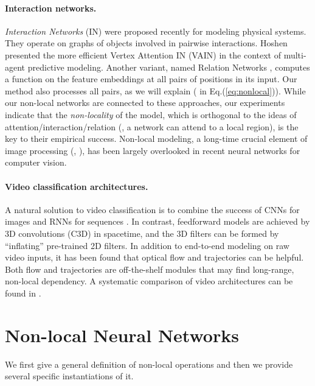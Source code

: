 \documentclass[10pt,twocolumn,letterpaper]{article}
\begin{document}
\paragraph{Interaction networks.} \emph{Interaction Networks} (IN) \cite{Battaglia2016,Watters2017} were proposed recently for modeling physical systems. They operate on graphs of objects involved in pairwise interactions. Hoshen \cite{Hoshen2017} presented the more efficient Vertex Attention IN (VAIN) in the context of multi-agent predictive modeling. Another variant, named Relation Networks \cite{Santoro2017}, computes a function on the feature embeddings at all pairs of positions in its input. Our method also processes all pairs, as we will explain ( in Eq.(\ref{eq:nonlocal})). While our non-local networks are connected to these approaches, our experiments indicate that the \emph{non-locality} of the model, which is orthogonal to the ideas of attention/interaction/relation (\eg, a network can attend to a local region), is the key to their empirical success. Non-local modeling, a long-time crucial element of image processing (\eg, \cite{Efros1999,Buades2005}), has been largely overlooked in recent neural networks for computer vision.

\paragraph{Video classification architectures.} A natural solution to video classification is to combine the success of CNNs for images and RNNs for sequences \cite{Yue-HeiNg2015,Donahue2015}. In contrast, feedforward models are achieved by 3D convolutions (C3D) \cite{Ji2010,Tran2015} in spacetime, and the 3D filters can be formed by ``inflating'' \cite{Feichtenhofer2016,Carreira2017} pre-trained 2D filters.
In addition to end-to-end modeling on raw video inputs, it has been found that optical flow \cite{Simonyan2014} and trajectories \cite{Wang2013a,Wang2015} can be helpful. Both flow and trajectories are off-the-shelf modules that may find long-range, non-local dependency. A systematic comparison of video architectures can be found in \cite{Carreira2017}.

\vspace{-.2em}
\section{Non-local Neural Networks}
We first give a general definition of non-local operations and then we provide several specific instantiations of it.
\end{document}
